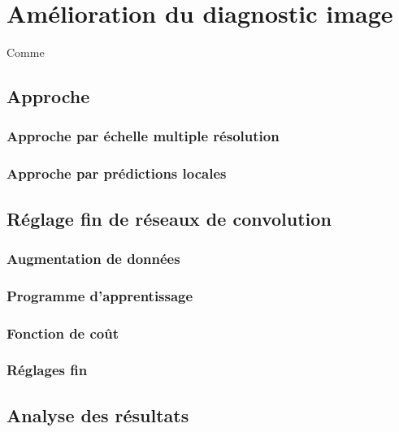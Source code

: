 \chapter{Amélioration du diagnostic image}
\label{chap:chapter_5}
\chapterintro
Comme 	
\newpage

\section{Approche}
\subsection{Approche par échelle multiple résolution}
\subsection{Approche par prédictions locales}
\section{Réglage fin de réseaux de convolution}
\subsection{Augmentation de données}
\subsection{Programme d'apprentissage}
\subsection{Fonction de coût}
\subsection{Réglages fin}
\section{Analyse des résultats}